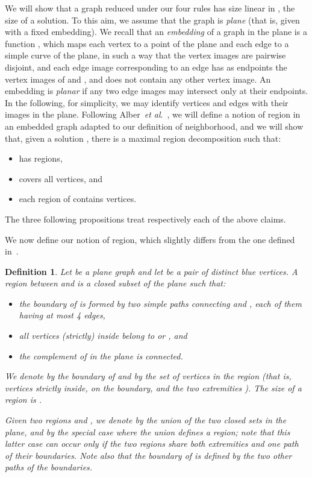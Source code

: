 \documentclass[a4paper,11pt]{article}
\newtheorem{defi} {Definition}
\begin{document}
We will show that a graph reduced under our four rules has size linear in , the size of a solution. To this aim, we assume that the graph is \emph{plane} (that is, given with a fixed embedding).
We recall that an \emph{embedding} of a graph  in the plane  is a function , which maps each vertex to a point of the plane and each edge to a simple curve of the plane, in such a way that the vertex images are pairwise disjoint, and each edge image corresponding to an edge  has as endpoints the vertex images of  and , and does not contain any other vertex image. An embedding is \emph{planar} if any two edge images may intersect only at their endpoints. In the following, for simplicity, we may identify vertices and edges with their images in the plane. Following Alber~\emph{et al}.~\cite{AFN04}, we will define a notion of region in an embedded graph adapted to our definition of neighborhood, and we will show that, given a solution , there is a maximal region decomposition  such that:
\begin{itemize}\itemsep0em
  \item  has  regions,
  \item  covers all vertices, and
  \item each region of  contains  vertices.
\end{itemize}
The three following propositions treat respectively each of the above claims.



We now define our notion of region, which slightly differs from the one defined in~\cite{AFN04}.

\begin{defi}\label{def:region}
Let  be a plane graph and let  be a pair of distinct blue vertices.
A \emph{region}  between  and  is a closed subset of the plane such that:
\begin{itemize}\itemsep0em
  \item the boundary of  is formed by two simple paths connecting  and , each of them having at most 4 edges,
  \item all vertices (strictly) inside  belong to  or , and
  \item the complement of  in the plane is connected.
\end{itemize}

We denote by  the boundary of  and by  the set of vertices in the region (that is, vertices strictly inside, on the boundary, and the two extremities ). The \emph{size} of a region is .


Given two regions  and , we denote by   the union of the two closed sets in the plane, and by  the special case where the union defines a region; note that this latter case can occur only if the two regions share both extremities and one path of their boundaries. Note also that the boundary of  is defined by the two other paths of the boundaries.
\end{defi}
\end{document}
